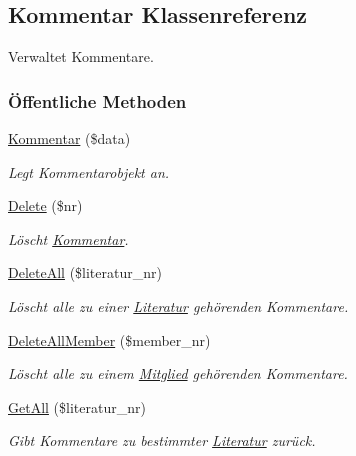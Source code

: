 \hypertarget{classKommentar}{
\subsection{Kommentar Klassenreferenz}
\label{classKommentar}
}
Verwaltet Kommentare.  


\subsubsection*{\"{O}ffentliche Methoden}
\begin{CompactItemize}
\item 
\hyperlink{classKommentar_ea774e2108c754890c602dfdd53d64e1}{Kommentar} (\$data)
\begin{CompactList}\small\item\em Legt Kommentarobjekt an. \item\end{CompactList}\item 
\hyperlink{classKommentar_31c1fdfb4fb8f24e0016c8ddb98ddcdc}{Delete} (\$nr)
\begin{CompactList}\small\item\em Löscht \hyperlink{classKommentar}{Kommentar}. \item\end{CompactList}\item 
\hyperlink{classKommentar_9903f1df98f71eefa3b44a81d6a8ee5c}{Delete\-All} (\$literatur\_\-nr)
\begin{CompactList}\small\item\em Löscht alle zu einer \hyperlink{classLiteratur}{Literatur} gehörenden Kommentare. \item\end{CompactList}\item 
\hyperlink{classKommentar_92a8fcea1b065341c7c53e8a8464fcf0}{Delete\-All\-Member} (\$member\_\-nr)
\begin{CompactList}\small\item\em Löscht alle zu einem \hyperlink{classMitglied}{Mitglied} gehörenden Kommentare. \item\end{CompactList}\item 
\hyperlink{classKommentar_33d65db8c526c50017a5fa029bc04416}{Get\-All} (\$literatur\_\-nr)
\begin{CompactList}\small\item\em Gibt Kommentare zu bestimmter \hyperlink{classLiteratur}{Literatur} zurück. \item\end{CompactList}\item 

\end{CompactItemize}
